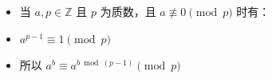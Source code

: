 \documentclass[E:/GsjzTle/main/main.tex]{subfiles}
\begin{document}
\begin{itemize}
\item
  当 \(a,p\in \mathbb{Z}\) 且 \(p\) 为质数，且 \(a\not\equiv 0\pmod{p}\)
  时有：
\item
  \(a^{p-1}\equiv 1\pmod{p}\)
\item
  所以 \(a^b\equiv a^{b\bmod (p-1)}\pmod p\)
\end{itemize}
\end{document}
